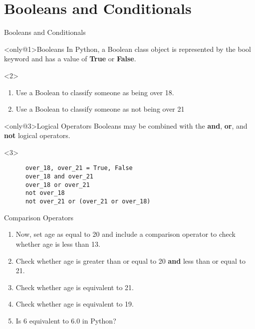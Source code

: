 \documentclass[../main.tex]{subfiles}
\begin{document}
\section{Booleans and Conditionals}
\label{sec:booleans}


\begin{frame}[fragile]{Booleans and Conditionals}

  \begin{block}<only@1>{Booleans} \justifying
In Python, a Boolean class object is represented by the bool keyword and has a value of \textbf{True} or \textbf{False}.
\end{block}

\begin{onlyenv}<2>
  \begin{exercise}{}
  \begin{enumerate}
  \item Use a Boolean to classify someone as being over 18.
  \item Use a Boolean to classify someone as not being over 21 
  \end{enumerate}
\end{exercise}
\end{onlyenv}


  \begin{block}<only@3>{Logical Operators}
    Booleans may be combined with the \textbf{and}, \textbf{or}, and \textbf{not} logical operators.
  \end{block}


  \begin{onlyenv}<3>
    \begin{code}{}
    \begin{lstlisting}
      over_18, over_21 = True, False
      over_18 and over_21
      over_18 or over_21
      not over_18
      not over_21 or (over_21 or over_18)
    \end{lstlisting}
  \end{code}
  \end{onlyenv}
\end{frame}

\begin{frame}[fragile]{Comparison Operators}
  \begin{exercise}{}
    \begin{enumerate} \justifying
    \item Now, set age as equal to 20 and include a comparison operator to check whether age is less than 13.
    \item Check whether age is greater than or equal to 20 \textbf{and} less than or equal to 21.
    \item Check whether age is equivalent to 21.
    \item Check whether age is equivalent to 19.
    \item Is 6 equivalent to 6.0 in Python? 
    \end{enumerate}
  \end{exercise}
\end{frame}
\end{document}
